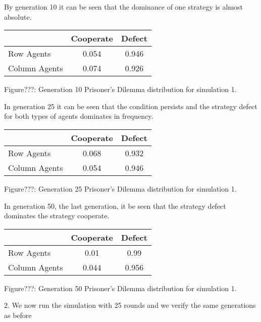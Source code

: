 \documentclass{article}
\begin{document}
By generation 10 it can be seen that the dominance of one strategy is almost absolute.

\begin{center}
\begin{tabular}{|l|c|c|}
\hline
& Cooperate & Defect \\ 
\hline
Row Agents & 0.054 & 0.946\\
\hline
Column Agents & 0.074 & 0.926\\
\hline
\end{tabular}
\end{center}
\begin{center}
Figure???: Generation 10 Prisoner’s Dilemma distribution for simulation 1.
\end{center}

In generation 25 it can be seen that the condition persists and the strategy defect for both types of agents dominates in frequency.
\begin{center}
\begin{tabular}{|l|c|c|}
\hline
& Cooperate & Defect \\ 
\hline
Row Agents & 0.068 & 0.932\\
\hline
Column Agents & 0.054 & 0.946\\
\hline
\end{tabular}
\end{center}
\begin{center}
Figure???: Generation 25 Prisoner’s Dilemma distribution for simulation 1.
\end{center}


In generation 50, the last generation, it be seen that the strategy defect dominates the strategy cooperate.
\begin{center}
\begin{tabular}{|l|c|c|}
\hline
& Cooperate & Defect \\ 
\hline
Row Agents & 0.01 & 0.99\\
\hline
Column Agents & 0.044 & 0.956\\
\hline
\end{tabular}
\end{center}
\begin{center}
Figure???: Generation 50 Prisoner’s Dilemma distribution for simulation 1.
\end{center}

2. We now run the simulation with 25 rounds and we verify the same generations as before
\end{document}
